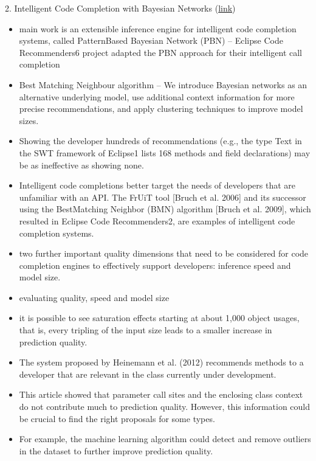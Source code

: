 2. Intelligent Code Completion with Bayesian Networks (\href{https://dl.acm.org/doi/pdf/10.1145/2744200}{link})
\begin{itemize}
    \item main work is an extensible inference engine for intelligent code completion systems, called PatternBased Bayesian Network (PBN) -- Eclipse Code Recommenders6 project adapted the PBN approach for their intelligent call completion
    \item Best Matching Neighbour algorithm -- We introduce Bayesian networks as an alternative underlying model, use additional context information for more precise recommendations, and apply clustering techniques to improve model sizes. 
    \item Showing the developer hundreds of recommendations (e.g., the type Text in the SWT framework of Eclipse1 lists 168 methods and field declarations) may be as ineffective as showing none.
    \item Intelligent code completions better target the needs of developers that are unfamiliar with an API. The FrUiT tool [Bruch et al. 2006] and its successor using the BestMatching Neighbor (BMN) algorithm [Bruch et al. 2009], which resulted in Eclipse Code Recommenders2, are examples of intelligent code completion systems.
    \item two further important quality dimensions that need to be considered for code completion engines to effectively support developers: inference speed and model size.
    \item evaluating quality, speed and model size
    \item it is possible to see saturation effects starting at about 1,000 object usages, that is, every tripling of the input size leads to a smaller increase in prediction quality.
    \item The system proposed by Heinemann et al. (2012) recommends methods to a developer that are relevant in the class currently under development.
    \item This article showed that parameter call sites and the enclosing class context do not contribute much to prediction quality. However, this information could be crucial to find the right proposals for some types.
    \item For example, the machine learning algorithm could detect and remove outliers in the dataset to further improve prediction quality. 
\end{itemize}